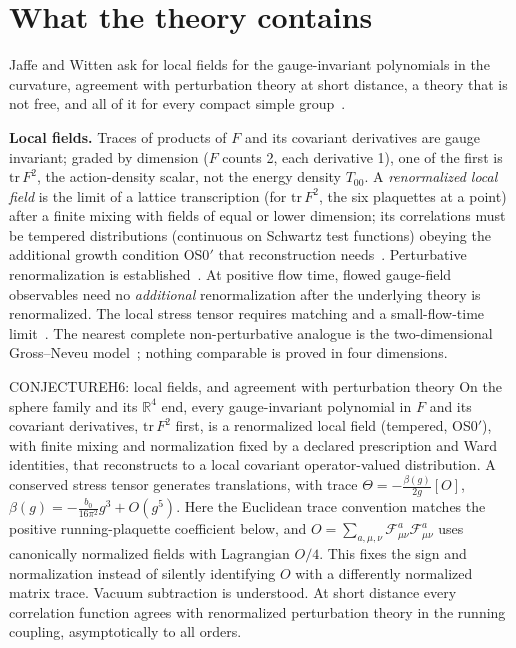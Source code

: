 \section{What the theory contains}

Jaffe and Witten ask for local fields for the gauge-invariant polynomials in the curvature, agreement with perturbation
theory at short distance, a theory that is not free, and all of it for every compact simple group~\cite{JaffeWitten}.

\textbf{Local fields.} Traces of products of $F$ and its covariant derivatives are gauge invariant; graded by dimension
($F$ counts 2, each derivative 1), one of the first is $\mathrm{tr}\,F^2$, the action-density scalar, not the energy density $T_{00}$.
A \emph{renormalized local field} is the limit of a lattice transcription (for
$\mathrm{tr}\,F^2$, the six plaquettes at a point) after a finite mixing with fields of equal or lower dimension; its correlations must be tempered distributions
(continuous on Schwartz test functions) obeying the additional growth condition OS0$'$ that reconstruction
needs~\cite{OS75}. Perturbative renormalization is established~\cite{Reisz88,Reisz89}. At positive flow time, flowed
gauge-field observables need no \emph{additional} renormalization after the underlying theory is renormalized.
The local stress tensor requires matching and a small-flow-time limit~\cite{Luscher10,LuscherWeisz11,Suzuki13}. The nearest
complete non-perturbative analogue is the two-dimensional Gross--Neveu model~\cite{GawedzkiKupiainen85,FMRS86}; nothing
comparable is proved in four dimensions.

\begin{claim}{CONJECTURE}{H6: local fields, and agreement with perturbation theory}\label{b:h6}
On the sphere family and its $\mathbb R^4$ end, every gauge-invariant polynomial in $F$ and its covariant derivatives,
$\mathrm{tr}\,F^2$ first, is a renormalized local field (tempered, OS0$'$), with finite mixing and normalization fixed
by a declared prescription and Ward identities, that reconstructs
to a local covariant operator-valued distribution. A conserved stress tensor generates translations, with trace
$\Theta=-\frac{\beta(g)}{2g}[O]$, $\beta(g)=-\frac{b_0}{16\pi^2}g^3+O(g^5)$. Here the Euclidean trace convention
matches the positive running-plaquette coefficient below, and $O=\sum_{a,\mu,\nu}\mathcal F^a_{\mu\nu}\mathcal F^a_{\mu\nu}$
uses canonically normalized fields with Lagrangian $O/4$. This fixes the sign and normalization instead of silently
identifying $O$ with a differently normalized matrix trace. Vacuum subtraction is understood. At short distance every
correlation function agrees with renormalized perturbation theory in the running coupling, asymptotically to all orders.
\end{claim}

